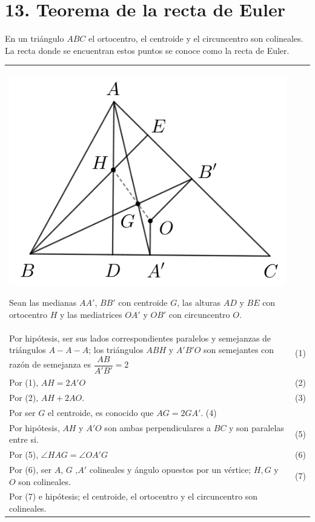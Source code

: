 \documentclass[12pt,a4paper, oneside]{book}
\begin{document}
\section{13. Teorema de la recta de Euler}
En un triángulo $ABC$ el ortocentro, el centroide y el circuncentro son colineales. La recta donde se encuentran estos puntos se conoce como la recta de Euler.\\
\begin{tabular}{p{15.9 cm} p{1cm}}
\\
\begin{center}
\includegraphics[scale=0.7]{Imagenes/recta_euler.png} 
\end{center}
Sean las medianas $AA'$, $BB'$ con centroide $G$, las alturas $AD$ y $BE$ con ortocentro $H$ y las mediatrices $OA'$ y $OB'$ con circuncentro $O$.
\\Por hipótesis, ser sus lados correspondientes  paralelos y semejanzas de triángulos $A-A-A$; los triángulos $ABH$ y $A'B'O$ son semejantes con razón de semejanza es $\dfrac{AB}{A'B'}=2$ &(1)
\\Por (1), $AH=2A'O$ &(2)
\\Por (2), $AH+2AO$. &(3)
\\Por ser $G$ el centroide, es conocido que $AG= 2GA'$. (4)
\\Por hipótesis, $AH$ y $A'O$ son ambas perpendiculares a $BC$ y son paralelas entre si. & (5)
\\Por (5), $\angle HAG= \angle OA'G$ &(6)
\\Por (6), ser $A$, $G$ ,$A'$ colineales y ángulo opuestos por un vértice; $H, G$ y $O$ son colineales. &(7)
\\Por (7) e hipótesis; el centroide, el ortocentro y el circuncentro son colineales.
\end{tabular}
\end{document}
